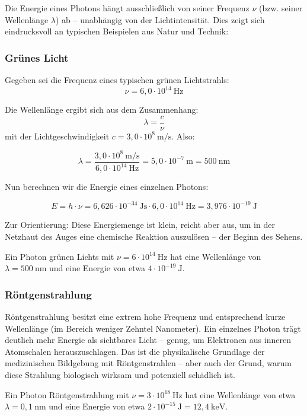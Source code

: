 Die Energie eines Photons hängt ausschließlich von seiner Frequenz $\nu$ (bzw. seiner Wellenlänge $\lambda$) ab – unabhängig von der Lichtintensität. Dies zeigt sich eindrucksvoll an typischen Beispielen aus Natur und Technik:

\subsubsection*{Grünes Licht}
Gegeben sei die Frequenz eines typischen grünen Lichtstrahls:
\[
\nu = 6{,}0 \cdot 10^{14}~\mathrm{Hz}
\]

Die Wellenlänge ergibt sich aus dem Zusammenhang:
\[
\lambda = \frac{c}{\nu}
\]
mit der Lichtgeschwindigkeit \( c = 3{,}0 \cdot 10^8~\mathrm{m/s} \). 
\newpage
\noindent
Also:

\[
\lambda = \frac{3{,}0 \cdot 10^8~\mathrm{m/s}}{6{,}0 \cdot 10^{14}~\mathrm{Hz}} = 5{,}0 \cdot 10^{-7}~\mathrm{m} = 500~\mathrm{nm}
\]

Nun berechnen wir die Energie eines einzelnen Photons:

\[
E = h \cdot \nu = 6{,}626 \cdot 10^{-34}~\mathrm{Js} \cdot 6{,}0 \cdot 10^{14}~\mathrm{Hz} = 3{,}976 \cdot 10^{-19}~\mathrm{J}
\]

Zur Orientierung: Diese Energiemenge ist klein, reicht aber aus, um in der Netzhaut des Auges eine chemische Reaktion auszulösen – der Beginn des Sehens.
\vspace{1em}

\begin{tcolorbox}[physikbox, title=Grünes Licht]
	\label{box:grünesLicht}
	Ein Photon grünen Lichts mit \( \nu = 6 \cdot 10^{14}~\mathrm{Hz} \) hat eine Wellenlänge von \( \lambda = 500~\mathrm{nm} \) und eine Energie von etwa \( 4 \cdot 10^{-19}~\mathrm{J} \).
\end{tcolorbox}

\subsubsection*{Röntgenstrahlung}
Röntgenstrahlung besitzt eine extrem hohe Frequenz und entsprechend kurze Wellenlänge (im Bereich weniger Zehntel Nanometer). Ein einzelnes Photon trägt deutlich mehr Energie als sichtbares Licht – genug, um Elektronen aus inneren Atomschalen herauszuschlagen. Das ist die physikalische Grundlage der medizinischen Bildgebung mit Röntgenstrahlen – aber auch der Grund, warum diese Strahlung biologisch wirksam und potenziell schädlich ist.
	\vspace{1em}
\begin{tcolorbox}[physikbox, title=Röntgenstrahlen]
	\label{box:röntgenstrahlen}
	Ein Photon Röntgenstrahlung mit \( \nu = 3 \cdot 10^{18}~\mathrm{Hz} \) hat eine Wellenlänge von etwa \( \lambda = 0{,}1~\mathrm{nm} \) und eine Energie von etwa \( 2 \cdot 10^{-15}~\mathrm{J} = 12{,}4~\mathrm{keV} \).
\end{tcolorbox}

